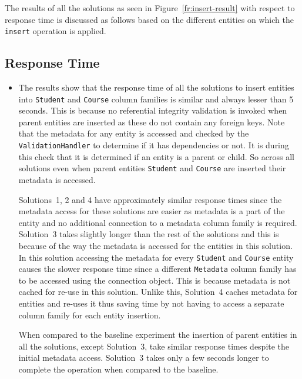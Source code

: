 	
	
	
	
	
	
	
The results of all the solutions as seen in Figure~\ref{fr:insert-result} with
respect to response time  is discussed as follows based on the different
entities on which the \texttt{insert} operation is applied.
\subsection{Response Time}
\begin{itemize}
  \item The results show that the response time of all
  the solutions to insert entities into \texttt{Student} and \texttt{Course}
  column families is similar and always lesser than 5 seconds. This is because
  no referential integrity validation is invoked when parent entities are
  inserted as these do not contain any foreign keys. Note that the metadata for
  any entity is accessed and checked by the \texttt{ValidationHandler}
  to determine if it has dependencies or not. It is during this
  check that it is determined if an entity is a parent or child. 
  So across all solutions even when parent entities \texttt{Student} and
  \texttt{Course} are inserted their metadata is accessed.
  
  Solutions~1, 2  and 4 have approximately similar response times since the metadata 
  access for these solutions are easier as metadata is a part of the entity and 
  no additional connection to a metadata column family is required. Solution~3
  takes slightly longer than the rest of the solutions and this is because of the way
  the metadata is accessed for the entities in this solution. 
  In this solution accessing the metadata for every 
  \texttt{Student} and \texttt{Course} entity causes the slower
  response time since a different \texttt{Metadata} column family has to be
  accessed using the connection object. This is because metadata is not cached
  for re-use in this solution. Unlike this, Solution~4 caches  metadata for
  entities and re-uses it thus saving time by not having to access a separate
  column family for each entity insertion.
  
  When compared to the baseline experiment the insertion of parent entities
  in all the solutions, except Solution~3, take similar response times despite
  the initial metadata access. Solution~3 takes only a few seconds
  longer to complete the operation when compared to the baseline.
  



\end{itemize}
